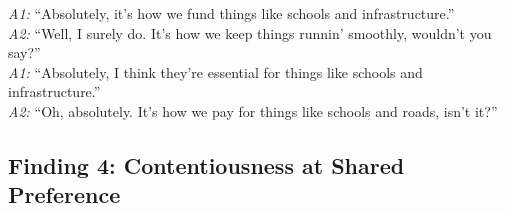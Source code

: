 \begin{tcolorbox}
\textit{A1:} ``Absolutely, it’s how we fund things like schools and infrastructure.''\\[-2pt]
\textit{A2:} ``Well, I surely do. It’s how we keep things runnin’ smoothly, wouldn’t you say?''\\[-2pt]
\textit{A1:} ``Absolutely, I think they're essential for things like schools and infrastructure.''\\[-2pt]
\textit{A2:} ``Oh, absolutely. It’s how we pay for things like schools and roads, isn’t it?''

\end{tcolorbox}

\subsection{Finding 4: Contentiousness at Shared Preference}

